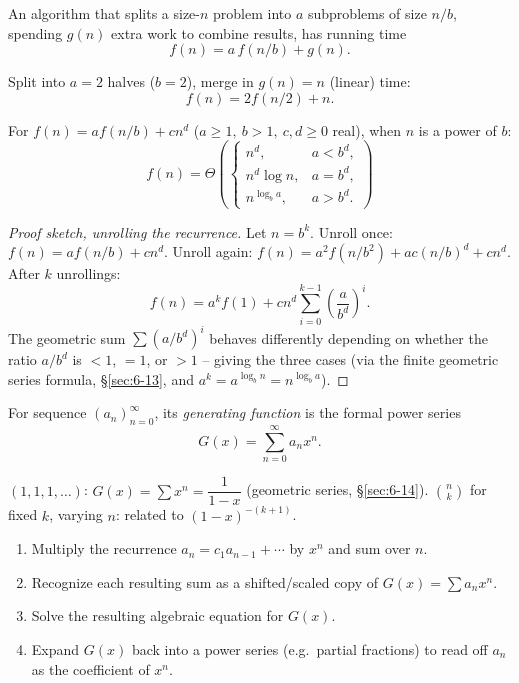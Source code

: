 \documentclass[11pt]{article}
\begin{document}
\bigskip
\begin{definition}
An algorithm that splits a size-$n$ problem into $a$ subproblems of size $n/b$, spending $g(n)$ extra work to combine results, has running time
\[
f(n) = a\,f(n/b) + g(n).
\]
\end{definition}

\begin{example}
Split into $a=2$ halves ($b=2$), merge in $g(n)=n$ (linear) time:
\[
f(n) = 2f(n/2)+n.
\]
\end{example}

\begin{theorem}[Master theorem, special case $g(n)=cn^d$, Rosen]
For $f(n)=af(n/b)+cn^d$ ($a\ge1,\ b>1,\ c,d\ge0$ real), when $n$ is a power of $b$:
\[
f(n) = \Theta\!\left(
\begin{cases}
n^d, & a<b^d, \\
n^d\log n, & a=b^d, \\
n^{\log_b a}, & a>b^d.
\end{cases}
\right)
\]
\end{theorem}
\begin{proof}[Proof sketch, unrolling the recurrence]
Let $n=b^k$. Unroll once: $f(n)=af(n/b)+cn^d$. Unroll again: $f(n)=a^2f(n/b^2)+ac(n/b)^d+cn^d$. After $k$ unrollings:
\[
f(n) = a^kf(1) + cn^d\sum_{i=0}^{k-1}\left(\frac{a}{b^d}\right)^i.
\]
The geometric sum $\sum(a/b^d)^i$ behaves differently depending on whether the ratio $a/b^d$ is $<1$, $=1$, or $>1$ -- giving the three cases (via the finite geometric series formula, \S\ref{sec:6-13}, and $a^k=a^{\log_b n}=n^{\log_b a}$).
\end{proof}

\bigskip
\begin{definition}
For sequence $(a_n)_{n=0}^{\infty}$, its \emph{generating function} is the formal power series
\[
G(x) = \sum_{n=0}^{\infty} a_n x^n.
\]
\end{definition}

\begin{example}
$(1,1,1,\dots)$: $G(x)=\sum x^n = \dfrac{1}{1-x}$ (geometric series, \S\ref{sec:6-14}). $\binom{n}{k}$ for fixed $k$, varying $n$: related to $(1-x)^{-(k+1)}$.
\end{example}

\begin{note}
\begin{enumerate}[label=\arabic*.]
    \item Multiply the recurrence $a_n=c_1a_{n-1}+\cdots$ by $x^n$ and sum over $n$.
    \item Recognize each resulting sum as a shifted/scaled copy of $G(x)=\sum a_nx^n$.
    \item Solve the resulting algebraic equation for $G(x)$.
    \item Expand $G(x)$ back into a power series (e.g.\ partial fractions) to read off $a_n$ as the coefficient of $x^n$.
\end{enumerate}
\end{note}
\end{document}
